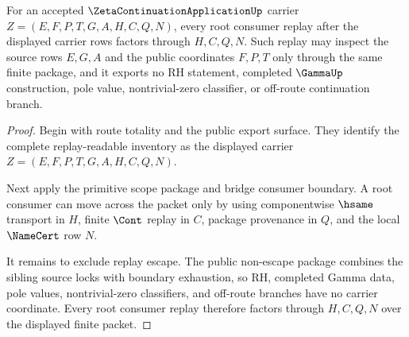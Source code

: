 \begin{theorem}
\label{thm:zeta-continuation-application-root-replay-nonescape}
For an accepted $\ZetaContinuationApplicationUp$ carrier $Z=(E,F,P,T,G,A,H,C,Q,N)$, every root consumer replay after the displayed carrier rows factors through $H,C,Q,N$. Such replay may inspect the source rows $E,G,A$ and the public coordinates $F,P,T$ only through the same finite package, and it exports no RH statement, completed $\GammaUp$ construction, pole value, nontrivial-zero classifier, or off-route continuation branch.
\end{theorem}
\begin{proof}
Begin with route totality and the public export surface. They identify the complete replay-readable inventory as the displayed carrier $Z=(E,F,P,T,G,A,H,C,Q,N)$.

Next apply the primitive scope package and bridge consumer boundary. A root consumer can move across the packet only by using componentwise $\hsame$ transport in $H$, finite $\Cont$ replay in $C$, package provenance in $Q$, and the local $\NameCert$ row $N$.

It remains to exclude replay escape. The public non-escape package combines the sibling source locks with boundary exhaustion, so RH, completed Gamma data, pole values, nontrivial-zero classifiers, and off-route branches have no carrier coordinate. Every root consumer replay therefore factors through $H,C,Q,N$ over the displayed finite packet.
\end{proof}

